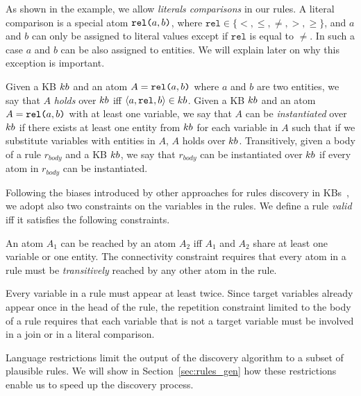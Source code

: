 As shown in the example, we allow \emph{literals comparisons} in our rules. A literal comparison is a special atom $\texttt{rel(}a,b\texttt{)}$, where $\texttt{rel} \in \{<,\leq,\neq,>,\geq\}$, and $a$ and $b$ can only be assigned to literal values except if $\texttt{rel}$ is equal to $\neq$. In such a case $a$ and $b$ can be also assigned to entities. We will explain later on why this exception is important.

Given a KB ${\sc kb}$ and an atom $A=\texttt{rel(}a,b\texttt{)}$ where $a$ and $b$ are two entities, we say that $A$ \emph{holds} over ${\sc kb}$ iff $\langle a,\texttt{rel},b\rangle \in {\sc kb}$.
Given a KB ${\sc kb}$ and an atom $A=\texttt{rel(}a,b\texttt{)}$ with at least one variable, we say that $A$ can be \emph{instantiated} over ${\sc kb}$ if there exists at least one entity from ${\sc kb}$ for each variable in $A$ such that if we substitute variables with entities in $A$, $A$ holds over ${\sc kb}$. Transitively, given a body of a rule $r_{body}$ and a KB ${\sc kb}$, we say that $r_{body}$ can be instantiated over ${\sc kb}$ if every atom in $r_{body}$ can be instantiated. 

Following the biases introduced by other approaches for rules discovery in KBs~\cite{galarraga2015fast,Chen:2016}, we adopt also two constraints on the variables in the rules.
We define a rule \emph{valid} iff it satisfies the following constraints.

\vspace{1ex}
 An atom $A_1$ can be reached by an atom $A_2$ iff $A_1$ and $A_2$ share at least one variable or one entity. The connectivity constraint requires that every atom in a rule must be \emph{transitively} reached by any other atom in the rule.

\vspace{1ex}
 Every variable in a rule must appear at least twice. Since target variables already appear once in the head of the rule, the repetition constraint limited to the body of a rule requires that each variable that is not a target variable must be involved in a join or in a literal comparison.

Language restrictions limit the output of the discovery algorithm to a subset of plausible rules. We will show in Section~\ref{sec:rules_gen} how these restrictions enable us to speed up the discovery process. %

